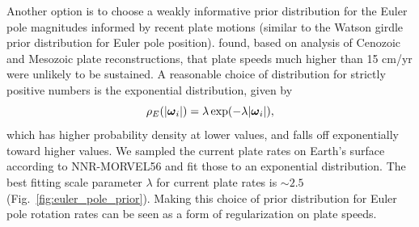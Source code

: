 \documentclass[11pt,letterpaper]{article}
\newcommand{\mitbf}[1]{\hbox{\mathversion{bold}$#1$}}
\begin{document}
Another option is to choose a weakly informative prior distribution for the Euler pole magnitudes informed by recent plate motions (similar to the Watson girdle prior distribution for Euler pole position). \cite{Zahirovic2015a} found, based on analysis of Cenozoic and Mesozoic plate reconstructions, that plate speeds much higher than 15 cm/yr were unlikely to be sustained. A reasonable choice of distribution for strictly positive numbers is the exponential distribution, given by
\begin{equation}
\rho_E(\vert \mitbf{\omega}_i \vert) = \lambda \exp(-\lambda \vert \mitbf{\omega}_i \vert),
\end{equation}
which has higher probability density at lower values, and falls off exponentially toward higher values. We sampled the current plate rates on Earth's surface according to NNR-MORVEL56 and fit those to an exponential distribution. The best fitting scale parameter $\lambda$ for current plate rates is $\sim2.5$ (Fig.~\ref{fig:euler_pole_prior}). Making this choice of prior distribution for Euler pole rotation rates can be seen as a form of regularization on plate speeds.
\end{document}
